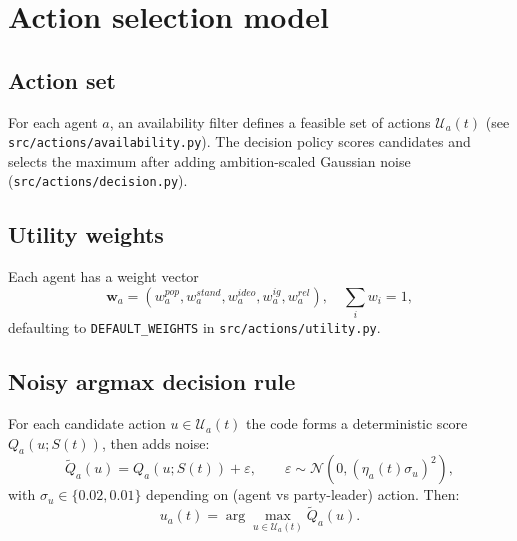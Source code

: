 \documentclass[11pt]{article}
\begin{document}
\section{Action selection model}
\subsection{Action set}
For each agent $a$, an availability filter defines a feasible set of actions
$\mathcal{U}_a(t)$ (see \texttt{src/actions/availability.py}). The decision policy
scores candidates and selects the maximum after adding ambition-scaled Gaussian noise
(\texttt{src/actions/decision.py}).

\begin{center}
\end{center}

\subsection{Utility weights}
Each agent has a weight vector
\[
  \mathbf{w}_a = (w^{pop}_a,w^{stand}_a,w^{ideo}_a,w^{ig}_a,w^{rel}_a),
  \quad \sum_i w_i = 1,
\]
defaulting to \texttt{DEFAULT\_WEIGHTS} in \texttt{src/actions/utility.py}.

\subsection{Noisy argmax decision rule}
For each candidate action $u \in \mathcal{U}_a(t)$ the code forms a deterministic
score $Q_a(u;S(t))$, then adds noise:
\[
  \tilde{Q}_a(u) = Q_a(u;S(t)) + \varepsilon,\qquad
  \varepsilon \sim \mathcal{N}(0, (\eta_a(t)\sigma_u)^2),
\]
with $\sigma_u \in \{0.02,0.01\}$ depending on (agent vs party-leader) action.
Then:
\[
  u_a(t) = \arg\max_{u \in \mathcal{U}_a(t)} \tilde{Q}_a(u).
\]
\end{document}

